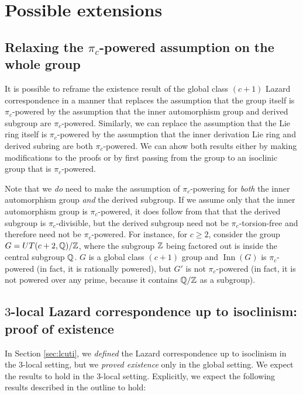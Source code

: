
\section{Possible extensions}\label{sec:possible-extensions}

\subsection{Relaxing the $\pi_c$-powered assumption on the whole group}

It is possible to reframe the existence result of the global class $(c
+ 1)$ Lazard correspondence in a manner that replaces the assumption
that the group itself is $\pi_c$-powered by the assumption that the
inner automorphism group and derived subgroup are
$\pi_c$-powered. Similarly, we can replace the assumption that the Lie
ring itself is $\pi_c$-powered by the assumption that the inner
derivation Lie ring and derived subring are both $\pi_c$-powered. We
can ahow both results either by making modifications to the proofs or
by first passing from the group to an isoclinic group that is
$\pi_c$-powered.

Note that we {\em do} need to make the assumption of $\pi_c$-powering
for {\em both} the inner automorphism group {\em and} the derived
subgroup. If we assume only that the inner automorphism group is
$\pi_c$-powered, it does follow from that that the derived subgroup is
$\pi_c$-divisible, but the derived subgroup need not be
$\pi_c$-torsion-free and therefore need not be $\pi_c$-powered. For
instance, for $c \ge 2$, consider the group $G = UT(c + 2,\mathbb{Q})/\mathbb{Z}$,
where the subgroup $\mathbb{Z}$ being factored out is inside the central
subgroup $\mathbb{Q}$. $G$ is a global class $(c + 1)$ group and
$\operatorname{Inn}(G)$ is $\pi_c$-powered (in fact, it is rationally
powered), but $G'$ is not $\pi_c$-powered (in fact, it is not powered
over any prime, because it contains $\mathbb{Q}/\mathbb{Z}$ as a subgroup).

\subsection{$3$-local Lazard correspondence up to isoclinism: proof of existence}

In Section \ref{sec:lcuti}, we {\em defined} the Lazard correspondence
up to isoclinism in the $3$-local setting, but we {\em proved
  existence} only in the global setting. We expect the results to hold
in the $3$-local setting. Explicitly, we expect the following results
described in the outline to hold:

